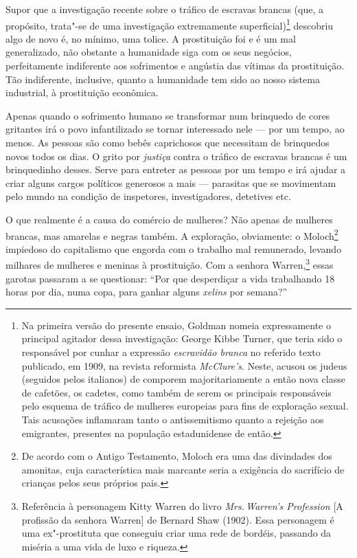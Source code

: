 Supor que a investigação recente sobre o tráfico de escravas brancas (que, a
propósito, trata"-se de uma investigação extremamente superficial)\footnote{Na
  primeira versão do presente ensaio, Goldman nomeia expressamente o principal agitador dessa investigação: George Kibbe Turner, que teria sido o responsável por cunhar a
  expressão \textit{escravidão branca} no referido texto publicado, em 1909, na
  revista reformista \textit{McClure's}. Neste, acusou os judeus
  (seguidos pelos italianos) de comporem majoritariamente a então nova
  classe de cafetões, os cadetes, como também de serem os principais
  responsáveis pelo esquema de tráfico de mulheres europeias para fins
  de exploração sexual. Tais acusações inflamaram tanto o
  antissemitismo quanto a rejeição aos emigrantes, presentes na
  população estadunidense de então.} descobriu algo de novo é, no
mínimo, uma tolice. A prostituição foi e é um mal generalizado, não
obstante a humanidade siga com os seus negócios, perfeitamente
indiferente aos sofrimentos e angústia das vítimas da prostituição. Tão
indiferente, inclusive, quanto a humanidade tem sido ao nosso sistema
industrial, à prostituição econômica.

Apenas quando o sofrimento humano se transformar num brinquedo de cores
gritantes irá o povo infantilizado se tornar interessado nele --- por um
tempo, ao menos. As pessoas são como bebês caprichosos que necessitam de
brinquedos novos todos os dias. O grito por \textit{justiça} contra o tráfico
de escravas brancas é um brinquedinho desses. Serve para entreter as
pessoas por um tempo e irá ajudar a criar alguns cargos políticos
generosos a mais --- parasitas que se movimentam pelo mundo na condição
de inspetores, investigadores, detetives etc.

O que realmente é a causa do comércio de mulheres? Não apenas de
mulheres brancas, mas amarelas e negras também. A exploração,
obviamente: o Moloch\footnote{De acordo com o Antigo Testamento, 
Moloch era uma das divindades dos amonitas, cuja característica mais marcante seria a exigência do sacrifício de crianças pelos seus próprios pais.} impiedoso do capitalismo que engorda com o trabalho
mal remunerado, levando milhares de mulheres e meninas à prostituição.
Com a senhora Warren,\footnote{Referência à personagem Kitty Warren do
  livro \textit{Mrs.\,Warren's Profession} {[}A profissão da senhora Warren{]} de Bernard Shaw (1902). Essa personagem é uma
  ex"-prostituta que conseguiu criar uma rede de bordéis, passando da
  miséria a uma vida de luxo e riqueza.} essas garotas passaram a se
questionar: ``Por que desperdiçar a vida trabalhando 18 horas por
dia, numa copa, para ganhar alguns \textit{xelins} por semana?''

